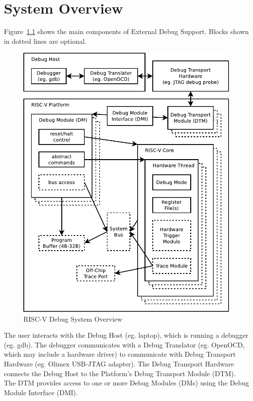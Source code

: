 \chapter{System Overview} \label{overview}

Figure~\ref{fig:overview} shows the main components of External Debug Support.
Blocks shown in dotted lines are optional. 

\begin{figure}
   \centering
   \includegraphics[width=\textwidth]{fig/overview-eps-converted-to.pdf}
   \caption{RISC-V Debug System Overview}
   \label{fig:overview}
\end{figure}

The user interacts with the Debug Host (eg. laptop), which is running a
debugger (eg. gdb).  The debugger communicates with a Debug Translator (eg.
OpenOCD, which may include a hardware driver) to communicate with Debug
Transport Hardware (eg.  Olimex USB-JTAG adapter).
The Debug Transport Hardware connects the Debug Host to the Platform's Debug
Transport Module (DTM).  The DTM provides access to one or more Debug Modules
(DMs) using the Debug Module Interface (DMI).


